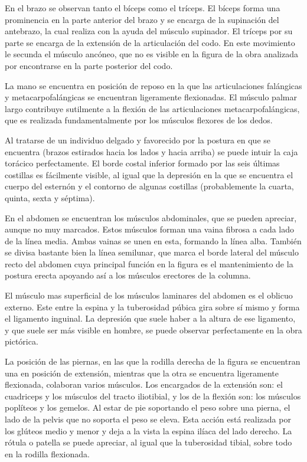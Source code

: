 En el brazo se observan tanto el bíceps como el tríceps. El bíceps forma una prominencia en la parte anterior del brazo y se encarga de la supinación del antebrazo, la cual realiza con la ayuda del músculo supinador. El tríceps por su parte se encarga de la extensión de la articulación del codo. En este movimiento le secunda el músculo ancóneo, que no es visible en la figura de la obra analizada por encontrarse en la parte posterior del codo.

La mano se encuentra en posición de reposo en la que las articulaciones falángicas y metacarpofalángicas se encuentran ligeramente flexionadas. El músculo palmar largo contribuye sutilmente a la flexión de las articulaciones metacarpofalángicas, que es realizada fundamentalmente por los músculos flexores de los dedos.

Al tratarse de un individuo delgado y favorecido por la postura en que se encuentra (brazos estirados hacia los lados y hacia arriba) se puede intuir la caja torácico perfectamente. El borde costal inferior formado por las seis últimas costillas es fácilmente visible, al igual que la depresión en la que se encuentra el cuerpo del esternón y el contorno de algunas costillas (probablemente la cuarta, quinta, sexta y séptima).

En el abdomen se encuentran los músculos abdominales, que se pueden apreciar, aunque no muy marcados. Estos músculos forman una vaina fibrosa a cada lado de la línea media. Ambas vainas se unen en esta, formando la línea alba. También se divisa bastante bien la línea semilunar, que marca el borde lateral del músculo recto del abdomen cuya principal función en la figura es el mantenimiento de la postura erecta apoyando así a los músculos erectores de la columna.

El músculo mas superficial de los músculos laminares del abdomen es el oblicuo externo. Este entre la espina y la tuberosidad púbica gira sobre sí mismo y forma el ligamento inguinal. La depresión que suele haber a la altura de ese ligamento, y que suele ser más visible en hombre, se puede observar perfectamente en la obra pictórica.

La posición de las piernas, en las que la rodilla derecha de la figura se encuentran una en posición de extensión, mientras que la otra se encuentra ligeramente flexionada, colaboran varios músculos. Los encargados de la extensión son: el cuadriceps y los músculos del tracto iliotibial, y los de la flexión son: los músculos poplíteos y los gemelos. Al estar de pie soportando el peso sobre una pierna, el lado de la pelvis que no soporta el peso se eleva. Esta acción está realizada por los glúteos medio y menor y deja a la vista la espina ilíaca del lado derecho.
La rótula o patella se puede apreciar, al igual que la tuberosidad tibial, sobre todo en la rodilla flexionada.


